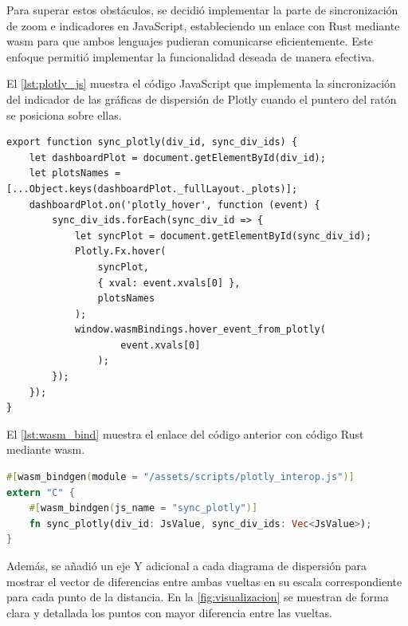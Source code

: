 Para superar estos obstáculos, se decidió implementar la parte de sincronización de zoom e indicadores en JavaScript, estableciendo un enlace con Rust mediante \ac{wasm} para que ambos lenguajes pudieran comunicarse eficientemente. Este enfoque permitió implementar la funcionalidad deseada de manera efectiva.

El \autoref{lst:plotly_js} muestra el código JavaScript que implementa la sincronización del indicador de las gráficas de dispersión de Plotly cuando el puntero del ratón se posiciona sobre ellas.


\begin{lstlisting}[label=lst:plotly_js, caption=Sincronización del indicador cuando el cursor pase por encima]
export function sync_plotly(div_id, sync_div_ids) {
    let dashboardPlot = document.getElementById(div_id);
    let plotsNames = [...Object.keys(dashboardPlot._fullLayout._plots)];
    dashboardPlot.on('plotly_hover', function (event) {
        sync_div_ids.forEach(sync_div_id => {
            let syncPlot = document.getElementById(sync_div_id);
            Plotly.Fx.hover(
                syncPlot,
                { xval: event.xvals[0] },
                plotsNames
            );
            window.wasmBindings.hover_event_from_plotly(
                    event.xvals[0]
                );
        });
    });
}
\end{lstlisting}
\vspace{1em}
El \autoref{lst:wasm_bind} muestra el enlace del código anterior con código Rust mediante \ac{wasm}.

\begin{lstlisting}[language=Rust, label=lst:wasm_bind, caption=Enlace del código JavaScript a Rust mediante \ac{wasm}]
#[wasm_bindgen(module = "/assets/scripts/plotly_interop.js")]
extern "C" {
    #[wasm_bindgen(js_name = "sync_plotly")]
    fn sync_plotly(div_id: JsValue, sync_div_ids: Vec<JsValue>);
}
\end{lstlisting}

Además, se añadió un eje Y adicional a cada diagrama de dispersión para mostrar el vector de diferencias entre ambas vueltas en su escala correspondiente para cada punto de la distancia. En la \autoref{fig:visualizacion} se muestran de forma clara y detallada los puntos con mayor diferencia entre las vueltas.

